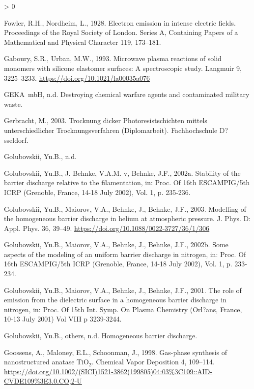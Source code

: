 \documentclass[
  11pt,
  twoside]{article}
\newlength{\cslhangindent}
\newenvironment{CSLReferences}[2] %
 {%
  \setlength{\parindent}{0pt}
  \ifodd #1 \everypar{\setlength{\hangindent}{\cslhangindent}}\ignorespaces\fi
  \ifnum #2 > 0
  \setlength{\parskip}{#2\baselineskip}
  \fi
 }%
 {}
\begin{document}
\begin{CSLReferences}{1}{0}
\leavevmode\hypertarget{ref-Fowl1928}{}%
Fowler, R.H., Nordheim, L., 1928. Electron emission in intense electric fields. Proceedings of the Royal Society of London. Series A, Containing Papers of a Mathematical and Physical Character 119, 173--181.

\leavevmode\hypertarget{ref-Gabo1993}{}%
Gaboury, S.R., Urban, M.W., 1993. Microwave plasma reactions of solid monomers with silicone elastomer surfaces: A spectroscopic study. Langmuir 9, 3225--3233. \url{https://doi.org/10.1021/la00035a076}

\leavevmode\hypertarget{ref-GEKA}{}%
GEKA~mbH, n.d. Destroying chemical warfare agents and contaminated military waste.

\leavevmode\hypertarget{ref-Gerb03}{}%
Gerbracht, M., 2003. {Trocknung dicker Photoresistschichten mittels unterschiedlicher Trocknungsverfahren} (Diplomarbeit). Fachhochschule D?sseldorf.

\leavevmode\hypertarget{ref-Filament}{}%
Golubovskii, Yu.B., n.d.

\leavevmode\hypertarget{ref-Golub02-2}{}%
Golubovskii, Yu.B., J. Behnke, V.A.M. v, Behnke, J.F., 2002a. Stability of the barrier discharge relative to the filamentation, in: Proc. Of 16th ESCAMPIG/5th ICRP (Grenoble, France, 14-18 July 2002), Vol. 1, p. 235-236.

\leavevmode\hypertarget{ref-Golub03}{}%
Golubovskii, Yu.B., Maiorov, V.A., Behnke, J., Behnke, J.F., 2003. Modelling of the homogeneous barrier discharge in helium at atmospheric pressure. J. Phys. D: Appl. Phys. 36, 39--49. \url{https://doi.org/10.1088/0022-3727/36/1/306}

\leavevmode\hypertarget{ref-Golub02}{}%
Golubovskii, Yu.B., Maiorov, V.A., Behnke, J., Behnke, J.F., 2002b. Some aspects of the modeling of an uniform barrier discharge in nitrogen, in: Proc. Of 16th ESCAMPIG/5th ICRP (Grenoble, France, 14-18 July 2002), Vol. 1, p. 233-234.

\leavevmode\hypertarget{ref-Golub01}{}%
Golubovskii, Yu.B., Maiorov, V.A., Behnke, J., Behnke, J.F., 2001. The role of emission from the dielectric surface in a homogeneous barrier discharge in nitrogen, in: Proc. Of 15th Int. Symp. On Plasma Chemistry (Orl?ans, France, 10-13 July 2001) Vol VIII p 3239-3244.

\leavevmode\hypertarget{ref-GolubWeb}{}%
Golubovskii, Yu.B., others, n.d. Homogeneous barrier discharge.

\leavevmode\hypertarget{ref-Goos1998}{}%
Goossens, A., Maloney, E.L., Schoonman, J., 1998. Gas-phase synthesis of nanostructured anatase \(\mathrm{TiO_2}\). Chemical Vapor Deposition 4, 109--114. \url{https://doi.org/10.1002/(SICI)1521-3862(199805)04:03\%3C109::AID-CVDE109\%3E3.0.CO;2-U}


\end{CSLReferences}
\end{document}
